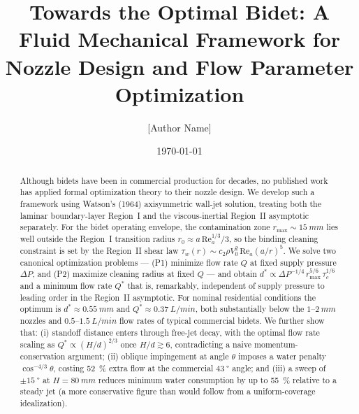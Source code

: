 \documentclass[aps,prfluids,reprint,amsmath,amssymb,floatfix]{revtex4-2}
\newcommand{\Rey}{\mathrm{Re}}
\begin{document}
\title{Towards the Optimal Bidet: A Fluid Mechanical Framework
  for Nozzle Design and Flow Parameter Optimization}

\author{[Author Name]}

\date{\today}

\begin{abstract}
Although bidets have been in commercial production for decades, no published
work has applied formal optimization theory to their nozzle design. We
develop such a framework using Watson's (1964) axisymmetric wall-jet solution,
treating both the laminar boundary-layer Region~I and the viscous-inertial
Region~II asymptotic separately. For the bidet operating envelope, the
contamination zone $r_\mathrm{max} \sim \SI{15}{mm}$ lies well outside
the Region~I transition radius $r_0 \approx a\,\Rey_a^{1/3}/3$, so the
binding cleaning constraint is set by the Region~II shear law
$\tau_w(r) \sim c_2 \rho V_0^2\,\Rey_a (a/r)^5$. We solve two canonical
optimization problems --- (P1) minimize flow rate $Q$ at fixed supply
pressure $\Delta P$, and (P2) maximize cleaning radius at fixed $Q$ ---
and obtain $d^* \propto \Delta P^{-1/4}\,r_\mathrm{max}^{5/6}\,\tau_c^{1/6}$
and a minimum flow rate $Q^*$ that is, remarkably, independent of supply
pressure to leading order in the Region~II asymptotic. For nominal
residential conditions the optimum is $d^* \approx \SI{0.55}{mm}$ and
$Q^* \approx \SI{0.37}{L/min}$, both substantially below the
$1$--$\SI{2}{mm}$ nozzles and $0.5$--$\SI{1.5}{L/min}$ flow rates of
typical commercial bidets. We further show that: (i) standoff
distance enters through free-jet decay, with the optimal flow rate
scaling as $Q^* \propto (H/d)^{2/3}$ once $H/d \gtrsim 6$, contradicting
a naive momentum-conservation argument; (ii) oblique impingement at
angle $\theta$ imposes a water penalty $\cos^{-4/3}\theta$, costing
\SI{52}{\percent} extra flow at the commercial $\SI{43}{\degree}$ angle;
and (iii) a sweep of $\pm\SI{15}{\degree}$ at $H = \SI{80}{mm}$
reduces minimum water consumption by up to \SI{55}{\percent} relative
to a steady jet (a more conservative figure than would follow from a
uniform-coverage idealization).
\end{abstract}

\maketitle
\end{document}
